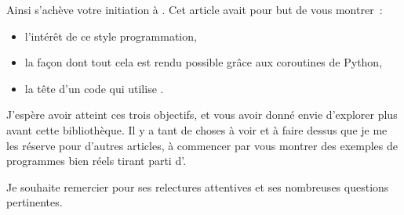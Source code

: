 \documentclass[small]{zmdocument}
\begin{document}
\begin{LevelOneConclusion}
Ainsi s’achève votre initiation à . Cet article avait pour but de vous montrer :

\begin{itemize}
\item\relax l’intérêt de ce style programmation,
\item\relax la façon dont tout cela est rendu possible grâce aux coroutines de Python,
\item\relax la tête d’un code qui utilise .
\end{itemize}
J’espère avoir atteint ces trois objectifs, et vous avoir donné envie d’explorer plus avant cette bibliothèque.
Il y a tant de choses à voir et à faire dessus que je me les réserve pour d’autres articles, à commencer par vous montrer des exemples de programmes bien réels tirant parti d'.

Je souhaite remercier  pour ses relectures attentives et ses nombreuses questions pertinentes. 
\end{LevelOneConclusion}
\end{document}
